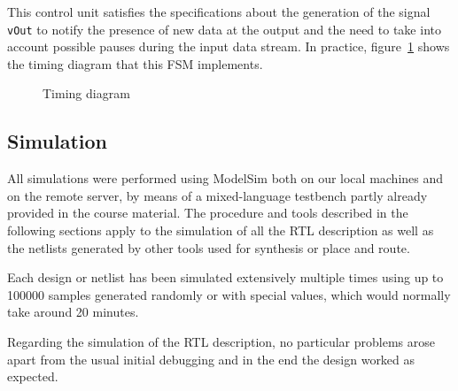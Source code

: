 \documentclass[a4paper]{article}
\begin{document}
This control unit satisfies the specifications about the generation of the signal \texttt{vOut} to notify the presence of new data at the output and the need to take into account possible pauses during the input data stream. In practice, figure~\ref{fig:timing} shows the timing diagram that this FSM implements.

\begin{figure}[hbtp]
    \centering
    \caption{Timing diagram}
    \label{fig:timing}
\end{figure}

\subsection{Simulation}
All simulations were performed using ModelSim both on our local machines and on the remote server, by means of a mixed-language testbench partly already provided in the course material. The procedure and tools described in the following sections apply to the simulation of all the RTL description as well as the netlists generated by other tools used for synthesis or place and route.

Each design or netlist has been simulated extensively multiple times using up to 100000 samples generated randomly or with special values, which would normally take around 20 minutes.

Regarding the simulation of the RTL description, no particular problems arose apart from the usual initial debugging and in the end the design worked as expected.
\end{document}

